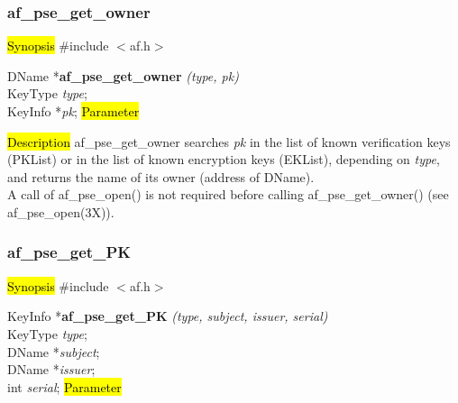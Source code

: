 \subsubsection{af\_pse\_get\_owner}
\label{af_search_PK}
\hl{Synopsis}
\#include $<$af.h$>$

DName *{\bf af\_pse\_get\_owner} {\em (type, pk)} \\
KeyType {\em type}; \\
KeyInfo *{\em pk};
\hl{Parameter}


\hl{Description}
af\_pse\_get\_owner searches {\em pk} in the list of known 
verification keys (PKList) or in the list of known encryption keys (EKList), depending
on {\em type}, and returns the name of its owner (address of DName).
\\ [1em]
A call of af\_pse\_open() is not required before calling af\_pse\_get\_owner()
(see af\_pse\_open(3X)).

\subsubsection{af\_pse\_get\_PK}
\label{af_search_Name}
\hl{Synopsis}
\#include $<$af.h$>$

KeyInfo *{\bf af\_pse\_get\_PK} {\em (type, subject, issuer, serial)} \\
KeyType {\em type}; \\
DName *{\em subject}; \\
DName *{\em issuer}; \\
int {\em serial};
\hl{Parameter}

